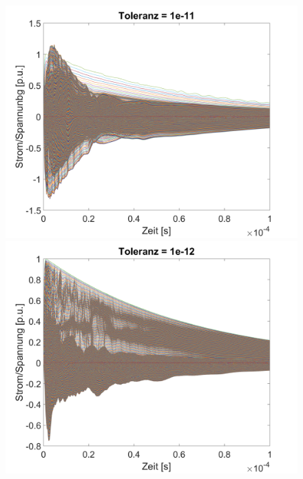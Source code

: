\begin{refsection}
	\begin{figure}
	    \centering
	    \begin{minipage}{.5\textwidth}
	        \centering
	        \includegraphics[width=\linewidth]{./trafo/images/svd11.png}
	    \end{minipage}%
	    \begin{minipage}{.5\textwidth}
	        \centering
	        \includegraphics[width=\linewidth]{./trafo/images/svd12.png}
	    \end{minipage}
		\begin{minipage}{.5\textwidth}
	        \centering

\end{minipage}
\end{figure}
\end{refsection}
